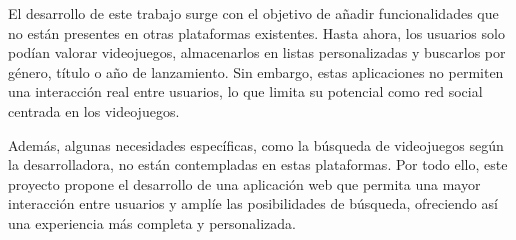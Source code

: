 El desarrollo de este trabajo surge con el objetivo de añadir funcionalidades que no están presentes en otras plataformas existentes. 
Hasta ahora, los usuarios solo podían valorar videojuegos, almacenarlos en listas personalizadas y buscarlos por género, título o año 
de lanzamiento. Sin embargo, estas aplicaciones no permiten una interacción real entre usuarios, lo que limita su potencial como red 
social centrada en los videojuegos.

Además, algunas necesidades específicas, como la búsqueda de videojuegos según la desarrolladora, no están contempladas en estas 
plataformas. Por todo ello, este proyecto propone el desarrollo de una aplicación web que permita una mayor interacción entre usuarios 
y amplíe las posibilidades de búsqueda, ofreciendo así una experiencia más completa y personalizada.